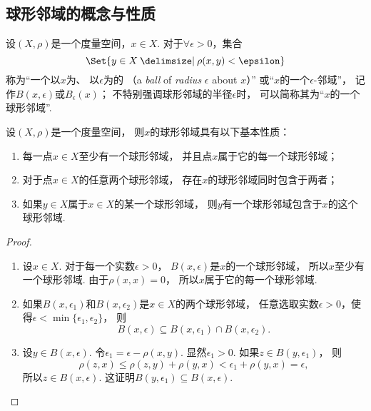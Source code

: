 \subsection{球形邻域的概念与性质}
\begin{definition}\label{definition:度量空间.球形邻域的概念}
设\((X,\rho)\)是一个度量空间，\(x \in X\).
对于\(\forall\epsilon>0\)，集合\[
	\Set{ y \in X \given \rho(x,y) < \epsilon }
\]
称为“一个以\(x\)为、
以\(\epsilon\)为的%
（a \emph{ball} of \emph{radius} \(\epsilon\) about \(x\)）”
或“\(x\)的一个\(\epsilon\)-邻域”，
记作\(B(x,\epsilon)\)或\(B_{\epsilon}(x)\)；
不特别强调球形邻域的半径\(\epsilon\)时，
可以简称其为“\(x\)的一个球形邻域”.
\end{definition}

\begin{theorem}\label{theorem:度量空间.球形邻域的性质}
设\((X,\rho)\)是一个度量空间，
则\(x\)的球形邻域具有以下基本性质：
\begin{enumerate}
	\item 每一点\(x \in X\)至少有一个球形邻域，
	并且点\(x\)属于它的每一个球形邻域；

	\item 对于点\(x \in X\)的任意两个球形邻域，
	存在\(x\)的球形邻域同时包含于两者；

	\item 如果\(y \in X\)属于\(x \in X\)的某一个球形邻域，
	则\(y\)有一个球形邻域包含于\(x\)的这个球形邻域.
\end{enumerate}
\begin{proof}
\begin{enumerate}
	\item 设\(x \in X\).
	对于每一个实数\(\epsilon>0\)，
	\(B(x,\epsilon)\)是\(x\)的一个球形邻域，
	所以\(x\)至少有一个球形邻域.
	由于\(\rho(x,x)=0\)，
	所以\(x\)属于它的每一个球形邻域.

	\item 如果\(B(x,\epsilon_1)\)和\(B(x,\epsilon_2)\)是\(x \in X\)的两个球形邻域，
	任意选取实数\(\epsilon>0\)，使得\(\epsilon<\min\{\epsilon_1,\epsilon_2\}\)，
	则\[
		B(x,\epsilon)
		\subseteq
		B(x,\epsilon_1) \cap B(x,\epsilon_2).
	\]

	\item 设\(y \in B(x,\epsilon)\).
	令\(\epsilon_1 = \epsilon - \rho(x,y)\).
	显然\(\epsilon_1>0\).
	如果\(z \in B(y,\epsilon_1)\)，
	则\[
		\rho(z,x)
		\leq \rho(z,y) + \rho(y,x)
		< \epsilon_1 + \rho(y,x)
		= \epsilon,
	\]
	所以\(z \in B(x,\epsilon)\).
	这证明\(B(y,\epsilon_1) \subseteq B(x,\epsilon)\).
	\qedhere
\end{enumerate}
\end{proof}
\end{theorem}

